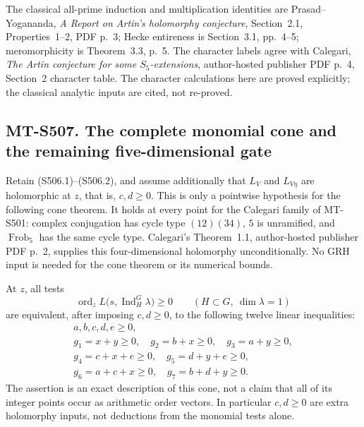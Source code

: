 The classical all-prime induction and multiplication identities
are Prasad--Yogananda, \emph{A Report on Artin's holomorphy
conjecture}, Section~2.1, Properties~1--2, PDF p.~3;
Hecke entireness is Section~3.1, pp.~4--5; meromorphicity is
Theorem~3.3, p.~5.  The character labels agree with Calegari,
\emph{The Artin conjecture for some $S_5$-extensions},
author-hosted publisher PDF p.~4, Section~2 character table.
The character calculations here are proved explicitly; the
classical analytic inputs are cited, not re-proved.

\subsection*{MT-S507. The complete monomial cone and the remaining five-dimensional gate}

Retain (S506.1)--(S506.2), and assume additionally that
$L_V$ and $L_{V\eta}$ are holomorphic at $z$, that is, $c,d\ge0$.
This is only a pointwise hypothesis for the following cone theorem.
It holds at every point for the Calegari family of MT-S501:
complex conjugation has cycle type $(12)(34)$, $5$ is unramified,
and $\operatorname{Frob}_5$ has the same cycle type.
Calegari's Theorem~1.1, author-hosted publisher PDF p.~2, supplies
this four-dimensional holomorphy unconditionally.  No GRH input
is needed for the cone theorem or its numerical bounds.

At $z$, all tests
\[
 \operatorname{ord}_z L\bigl(s,\operatorname{Ind}_H^G\lambda\bigr)
             \ge0\qquad(H\subset G,\ \dim\lambda=1)
 \tag{S507.1}
\]
are equivalent, after imposing $c,d\ge0$, to the following twelve
linear inequalities:
\[
 \begin{gathered}
      a,b,c,d,e\ge0,\\
 g_1=x+y\ge0,\quad g_2=b+x\ge0,\quad g_3=a+y\ge0,\\
 g_4=c+x+e\ge0,\quad g_5=d+y+e\ge0,\\
 g_6=a+c+x\ge0,\quad g_7=b+d+y\ge0.
 \end{gathered}
 \tag{S507.2}
\]
The assertion is an exact description of this cone, not a claim
that all of its integer points occur as arithmetic order vectors.
In particular $c,d\ge0$ are extra holomorphy inputs, not deductions
from the monomial tests alone.

